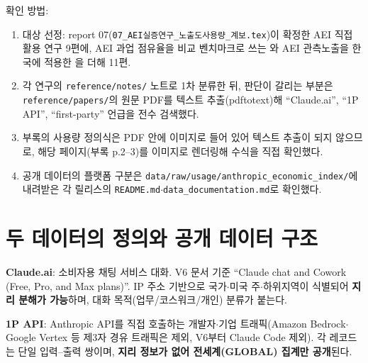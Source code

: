 \documentclass[11pt]{article}
\begin{document}
확인 방법:
\begin{enumerate}[label=(\arabic*)]
  \item 대상 선정: report 07(\texttt{07\_AEI실증연구\_노출도사용량\_계보.tex})이 확정한 AEI 직접 활용 연구 9편에, AEI 과업 점유율을 비교 벤치마크로 쓰는 \textcite{bick-2026-what-work-does-generative}와 AEI 관측노출을 한국에 적용한 \textcite{kim-2026-generative-ai-korean-labor-market}을 더해 11편.
  \item 각 연구의 \texttt{reference/notes/} 노트로 1차 분류한 뒤, 판단이 갈리는 부분은 \texttt{reference/papers/}의 원문 PDF를 텍스트 추출(pdftotext)해 ``Claude.ai'', ``1P API'', ``first-party'' 언급을 전수 검색했다.
  \item \textcite{massenkoff-2026-labor-market-impacts-of-ai} 부록의 사용량 정의식은 PDF 안에 이미지로 들어 있어 텍스트 추출이 되지 않으므로, 해당 페이지(부록 p.2--3)를 이미지로 렌더링해 수식을 직접 확인했다.
  \item 공개 데이터의 플랫폼 구분은 \texttt{data/raw/usage/anthropic\_economic\_index/}에 내려받은 각 릴리스의 \texttt{README.md}$\cdot$\texttt{data\_documentation.md}로 확인했다.
\end{enumerate}

\section{두 데이터의 정의와 공개 데이터 구조}
\label{sec:platform}

\textbf{Claude.ai}: 소비자용 채팅 서비스 대화. V6 문서 기준 ``Claude chat and Cowork (Free, Pro, and Max plans)''. IP 주소 기반으로 국가$\cdot$미국 주$\cdot$하위지역이 식별되어 \textbf{지리 분해가 가능}하며, 대화 목적(업무/코스워크/개인) 분류가 붙는다.

\textbf{1P API}: Anthropic API를 직접 호출하는 개발자$\cdot$기업 트래픽(Amazon Bedrock$\cdot$Google Vertex 등 제3자 경유 트래픽은 제외, V6부터 Claude Code 제외). 각 레코드는 단일 입력--출력 쌍이며, \textbf{지리 정보가 없어 전세계(GLOBAL) 집계만 공개}된다.
\end{document}
